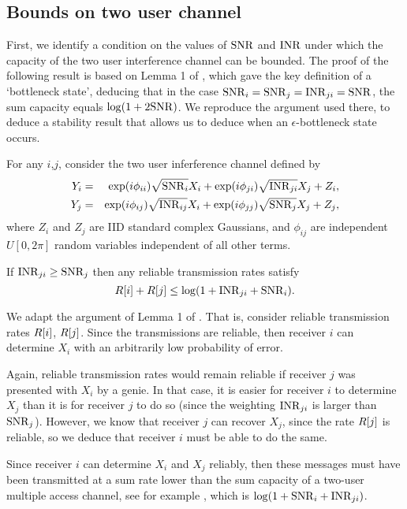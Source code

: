 \documentclass[journal]{IEEEtran}
\begin{document}
\subsection{Bounds on two user channel} \label{sec:condition}
%
First, we identify a condition on the values of 
${\rm{SNR}}$ and ${\rm{INR}}$ under which the capacity of the two user 
interference channel can be bounded.
The proof of the following result is based on Lemma 1
of \cite{jafar}, which gave the key definition of a `bottleneck state', deducing
that in the case ${\rm{SNR}}_i = {\rm{SNR}}_j = {\rm{INR}}_{ji} = {\rm{SNR}}$, the sum capacity equals
$\log(1+2{\rm{SNR}})$. We reproduce the argument used there, to deduce a stability
result that allows us to deduce when an $\epsilon$-bottleneck state occurs.
%
\begin{lemma} \label{lem:twouser}
For any $i$,$j$, consider the two user inferference channel defined
by
\begin{eqnarray*}
Y_i &= & \exp(i \phi_{ii}) \sqrt{{\rm{SNR}}_i} X_i + \exp(i \phi_{ji}) \sqrt{{\rm{INR}}_{ji}} X_j + Z_i, \\
Y_j &= & \exp(i \phi_{ij}) \sqrt{{\rm{INR}}_{ij}} X_i + \exp(i \phi_{jj})  \sqrt{{\rm{SNR}}_j} X_j + Z_j,
\end{eqnarray*}
where $Z_i$ and $Z_j$ are IID standard complex Gaussians,  and $\phi_{ij}$ are
independent $U[0,2\pi]$ random variables independent of all other terms.

If ${\rm{INR}}_{ji} \geq {\rm{SNR}}_{j}$ then any reliable transmission rates
satisfy
\begin{equation} \label{summedconstraints}
R[i] + R[j] \leq \log(1 + {\rm{INR}}_{ji} + {\rm{SNR}}_i).\end{equation}
\end{lemma}
\begin{IEEEproof}
We adapt the argument of Lemma 1 of \cite{jafar}. That is, consider
reliable transmission rates $R[i]$, $R[j]$. Since the transmissions are
reliable, then receiver $i$ can determine $X_i$ with an arbitrarily low
probability of error.

Again, reliable transmission
rates would remain reliable if receiver $j$ was presented with $X_i$ by a 
genie. In that case, it is easier for receiver $i$ to determine $X_j$ than it is 
for receiver $j$ to do so (since the weighting ${\rm{INR}}_{ji}$ is larger than ${\rm{SNR}}_j$).
However, we know that receiver $j$ can recover $X_j$, since the rate $R[j]$ is 
reliable, so we deduce that
receiver $i$ must be able to do the same.

Since receiver $i$ can determine $X_i$ and $X_j$ reliably, then these messages
must have been transmitted at a sum rate lower than the sum capacity of
a two-user multiple access channel, see for example \cite[Equation (6.6)]{tse},
 which is $\log(1 + {\rm{SNR}}_i + {\rm{INR}}_{ji})$.
\end{IEEEproof}
%
\end{document}
